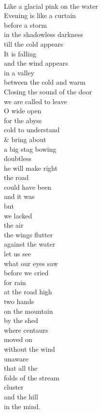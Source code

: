\documentclass[smalldemyvopaper,11pt,twoside,onecolumn,openright,extrafontsizes]{memoir}
\begin{document}
\\Like a glacial pink on the water
\\Evening is like a curtain
\\before a storm
\\in the shadowless darkness
\\till the cold appears
\\It is falling
\\and the wind appears
\\in a valley
\\between the cold and warm
\\Closing the sound of the door
\\we are called to leave
\\O wide open
\\for the abyss
\\cold                       to understand
\\\& bring about
\\a big stag bowing
\\doubtless
\\he will make right
\\the road
\\could have been
\\and it was
\\but
\\we lacked
\\the air
\\the wings flutter
\\against the water
\\let us see
\\what our eyes saw
\\before we cried
\\for rain
\\at the road high
\\two hands
\\on the mountain
\\by the shed
\\where centaurs
\\moved on
\\without the wind
\\unaware
\\that all the
\\folds of the stream
\\cluster
\\and the hill
\\in the mind.
\end{document}
